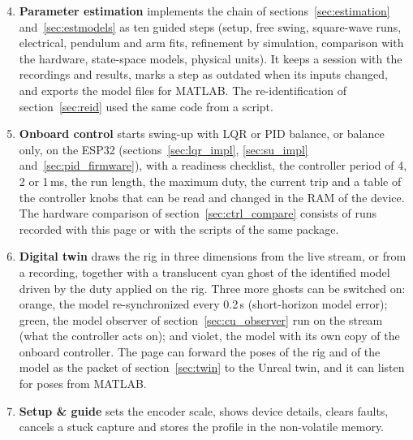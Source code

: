 \documentclass[a4paper,11pt]{article}
\begin{document}
\begin{enumerate}
  \setcounter{enumi}{3}
  \item \textbf{Parameter estimation} implements the chain of sections~\ref{sec:estimation} and~\ref{sec:estmodels} as ten guided steps (setup, free swing, square-wave runs, electrical, pendulum and arm fits, refinement by simulation, comparison with the hardware, state-space models, physical units). It keeps a session with the recordings and results, marks a step as outdated when its inputs changed, and exports the model files for MATLAB. The re-identification of section~\ref{sec:reid} used the same code from a script.
  \item \textbf{Onboard control} starts swing-up with LQR or PID balance, or balance only, on the ESP32 (sections~\ref{sec:lqr_impl}, \ref{sec:su_impl} and~\ref{sec:pid_firmware}), with a readiness checklist, the controller period of 4, 2 or 1\,ms, the run length, the maximum duty, the current trip and a table of the controller knobs that can be read and changed in the RAM of the device. The hardware comparison of section~\ref{sec:ctrl_compare} consists of runs recorded with this page or with the scripts of the same package.
  \item \textbf{Digital twin} draws the rig in three dimensions from the live stream, or from a recording, together with a translucent cyan ghost of the identified model driven by the duty applied on the rig. Three more ghosts can be switched on: orange, the model re-synchronized every 0.2\,s (short-horizon model error); green, the model observer of section~\ref{sec:cu_observer} run on the stream (what the controller acts on); and violet, the model with its own copy of the onboard controller. The page can forward the poses of the rig and of the model as the packet of section~\ref{sec:twin} to the Unreal twin, and it can listen for poses from MATLAB.
  \item \textbf{Setup \& guide} sets the encoder scale, shows device details, clears faults, cancels a stuck capture and stores the profile in the non-volatile memory.
\end{enumerate}
\end{document}
